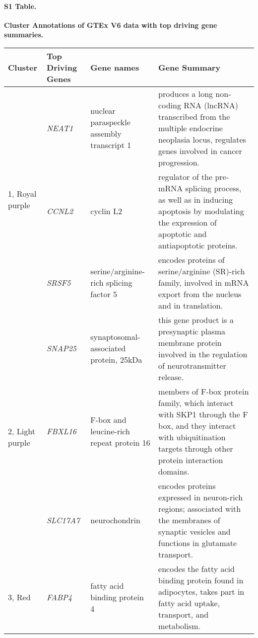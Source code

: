 \documentclass[10pt,letterpaper]{article}
\begin{document}
\paragraph*{S1 Table.}
\label{supptab1}
{\bf Cluster Annotations of GTEx V6 data with top driving gene summaries.}

\begin{table}[!hp]
\begin{adjustwidth}{-.5in}{0in}
\begin{tabular}{|p{0.6in}|p{0.6in}|p{1.3 in}|p{3.8in}|}
\hline
Cluster & Top Driving \qquad Genes & Gene names  & Gene Summary \\
\hline
\multirow{3}{4em}{\scriptsize{1, Royal purple} } &  \small{\textit{NEAT1}} & \scriptsize{nuclear paraspeckle assembly transcript 1} & \scriptsize{produces a long non-coding RNA (lncRNA) transcribed from the multiple endocrine neoplasia locus, regulates genes involved in cancer progression.}\\
				& \small{\textit{CCNL2}} & \scriptsize{cyclin L2} & \scriptsize{regulator of the pre-mRNA splicing process, as well as in inducing apoptosis by modulating the expression of apoptotic and antiapoptotic proteins.}\\
				& \small{\textit{SRSF5}} & \scriptsize{serine/arginine-rich splicing factor 5} & \scriptsize{encodes proteins of serine/arginine (SR)-rich family,  involved in mRNA export from the nucleus and in translation.}\\
\hline
 \multirow{3}{4em}{\scriptsize{2, Light purple} } & \small{\textit{SNAP25}}  & \scriptsize{synaptosomal-associated protein, 25kDa} & \scriptsize{this gene product is a presynaptic plasma membrane protein involved in the regulation of neurotransmitter release.} \\
 					&  \small{\textit{FBXL16}}  & \scriptsize{F-box and leucine-rich repeat protein 16} & \scriptsize{members of F-box protein family, which interact with SKP1 through the F box, and they interact with ubiquitination targets through other protein interaction domains.} \\
					&  \small{\textit{SLC17A7}}  & \scriptsize{neurochondrin} & \scriptsize{encodes proteins expressed in neuron-rich regions; associated with the membranes of synaptic vesicles and functions in glutamate transport.} \\
\hline
 \multirow{3}{4em}{\scriptsize{3, Red} } & \small{\textit{FABP4}}  & \scriptsize{fatty acid binding protein 4} & \scriptsize{ encodes the fatty acid binding protein found in adipocytes, takes part in fatty acid uptake, transport, and metabolism.} \\

\end{tabular}
\end{adjustwidth}
\end{table}
\end{document}
